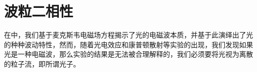 \chapter{波粒二相性}
在中，我们基于麦克斯韦电磁场方程揭示了光的电磁波本质，并基于此演绎出了光的种种波动特性，然而，随着光电效应和康普顿散射等实验的出现，我们发现如果光是一种电磁波，那么实验的结果是无法被合理解释的，我们必须要将光视为离散的粒子流，即所谓光子。




